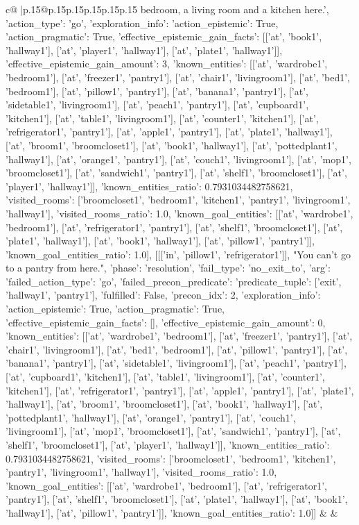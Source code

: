 \documentclass{article}
\begin{document}
{\begin{supertabular}{c@{$\;$}|p{.15\linewidth}@{}p{.15\linewidth}p{.15\linewidth}p{.15\linewidth}p{.15\linewidth}p{.15\linewidth}}
{{{bedroom, a living room and a kitchen here.', {'action_type': 'go', 'exploration_info': {'action_epistemic': True, 'action_pragmatic': True, 'effective_epistemic_gain_facts': [['at', 'book1', 'hallway1'], ['at', 'player1', 'hallway1'], ['at', 'plate1', 'hallway1']], 'effective_epistemic_gain_amount': 3, 'known_entities': [['at', 'wardrobe1', 'bedroom1'], ['at', 'freezer1', 'pantry1'], ['at', 'chair1', 'livingroom1'], ['at', 'bed1', 'bedroom1'], ['at', 'pillow1', 'pantry1'], ['at', 'banana1', 'pantry1'], ['at', 'sidetable1', 'livingroom1'], ['at', 'peach1', 'pantry1'], ['at', 'cupboard1', 'kitchen1'], ['at', 'table1', 'livingroom1'], ['at', 'counter1', 'kitchen1'], ['at', 'refrigerator1', 'pantry1'], ['at', 'apple1', 'pantry1'], ['at', 'plate1', 'hallway1'], ['at', 'broom1', 'broomcloset1'], ['at', 'book1', 'hallway1'], ['at', 'pottedplant1', 'hallway1'], ['at', 'orange1', 'pantry1'], ['at', 'couch1', 'livingroom1'], ['at', 'mop1', 'broomcloset1'], ['at', 'sandwich1', 'pantry1'], ['at', 'shelf1', 'broomcloset1'], ['at', 'player1', 'hallway1']], 'known_entities_ratio': 0.7931034482758621, 'visited_rooms': ['broomcloset1', 'bedroom1', 'kitchen1', 'pantry1', 'livingroom1', 'hallway1'], 'visited_rooms_ratio': 1.0, 'known_goal_entities': [['at', 'wardrobe1', 'bedroom1'], ['at', 'refrigerator1', 'pantry1'], ['at', 'shelf1', 'broomcloset1'], ['at', 'plate1', 'hallway1'], ['at', 'book1', 'hallway1'], ['at', 'pillow1', 'pantry1']], 'known_goal_entities_ratio': 1.0}}], [[['in', 'pillow1', 'refrigerator1']], "You can't go to a pantry from here.", {'phase': 'resolution', 'fail_type': 'no_exit_to', 'arg': {'failed_action_type': 'go', 'failed_precon_predicate': {'predicate_tuple': ['exit', 'hallway1', 'pantry1'], 'fulfilled': False, 'precon_idx': 2}}, 'exploration_info': {'action_epistemic': True, 'action_pragmatic': True, 'effective_epistemic_gain_facts': [], 'effective_epistemic_gain_amount': 0, 'known_entities': [['at', 'wardrobe1', 'bedroom1'], ['at', 'freezer1', 'pantry1'], ['at', 'chair1', 'livingroom1'], ['at', 'bed1', 'bedroom1'], ['at', 'pillow1', 'pantry1'], ['at', 'banana1', 'pantry1'], ['at', 'sidetable1', 'livingroom1'], ['at', 'peach1', 'pantry1'], ['at', 'cupboard1', 'kitchen1'], ['at', 'table1', 'livingroom1'], ['at', 'counter1', 'kitchen1'], ['at', 'refrigerator1', 'pantry1'], ['at', 'apple1', 'pantry1'], ['at', 'plate1', 'hallway1'], ['at', 'broom1', 'broomcloset1'], ['at', 'book1', 'hallway1'], ['at', 'pottedplant1', 'hallway1'], ['at', 'orange1', 'pantry1'], ['at', 'couch1', 'livingroom1'], ['at', 'mop1', 'broomcloset1'], ['at', 'sandwich1', 'pantry1'], ['at', 'shelf1', 'broomcloset1'], ['at', 'player1', 'hallway1']], 'known_entities_ratio': 0.7931034482758621, 'visited_rooms': ['broomcloset1', 'bedroom1', 'kitchen1', 'pantry1', 'livingroom1', 'hallway1'], 'visited_rooms_ratio': 1.0, 'known_goal_entities': [['at', 'wardrobe1', 'bedroom1'], ['at', 'refrigerator1', 'pantry1'], ['at', 'shelf1', 'broomcloset1'], ['at', 'plate1', 'hallway1'], ['at', 'book1', 'hallway1'], ['at', 'pillow1', 'pantry1']], 'known_goal_entities_ratio': 1.0}}]] 
	  } 
	   } 
	   } 
	 & & \\ 
 


\end{supertabular}}
\end{document}
